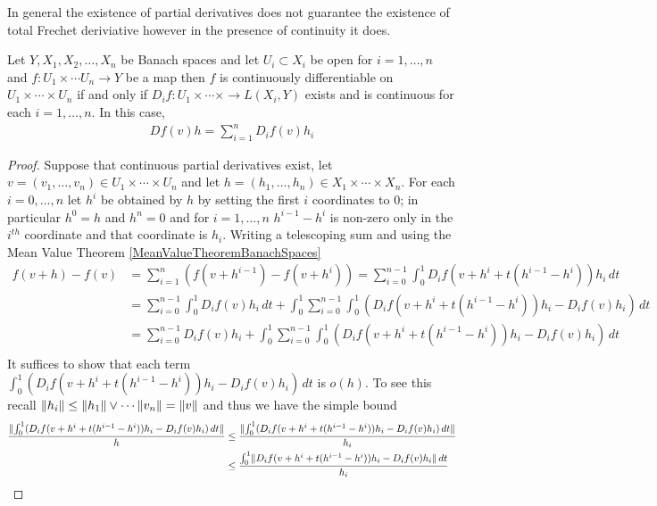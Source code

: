In general the existence of partial derivatives does not guarantee the existence of total Frechet deriviative however in the presence of continuity it does.
\begin{prop}\label{PartialDerivativesBanachSpaces}Let $Y,X_1, X_2, \dotsc, X_n$ be Banach spaces and let $U_i \subset X_i$ be open for $i=1, \dotsc, n$ and $f : U_1 \times \dotsb U_n \to Y$ be a map then $f$ is continuously differentiable on $U_1 \times \dotsb \times U_n$ if and only if $D_i f : U_1 \times \dotsb \times \to L(X_i,Y)$ exists and is continuous for each $i=1, \dotsc,n$.
In this case,
\begin{align*}
D f (v) h = \sum_{i=1}^n D_i f( v) h_i
\end{align*}
\end{prop}
\begin{proof}
Suppose that continuous partial derivatives exist, let $v=(v_1, \dotsc, v_n) \in U_1 \times \dotsb \times U_n$ and let $h=(h_1, \dotsc, h_n) \in X_1 \times \dotsb \times X_n$.  
For each $i=0, \dotsc, n$ let $h^i$ be obtained by $h$ by setting the first $i$ coordinates to $0$; in particular $h^0=h$ and $h^n=0$ and for $i=1, \dotsc, n$ $h^{i-1}-h^{i}$ is non-zero only in the $i^{th}$ coordinate and that coordinate is $h_i$.
Writing a telescoping sum and using the Mean Value Theorem \ref{MeanValueTheoremBanachSpaces}
\begin{align*}
f(v + h) - f(v) &= \sum_{i=1}^{n} (f(v + h^{i-1}) - f(v+h^{i})) = \sum_{i=0}^{n-1} \int_0^1 D_i f(v+h^i + t(h^{i-1}-h^i)) h_i \, dt \\
&=\sum_{i=0}^{n-1} \int_0^1 D_i f (v) h_i \, dt + \int_0^1 \sum_{i=0}^{n-1} \int_0^1 (D_i f(v+h^i + t(h^{i-1}-h^i)) h_i - D_i f (v) h_i )\, dt \\
&=\sum_{i=0}^{n-1} D_i f (v) h_i + \int_0^1 \sum_{i=0}^{n-1} \int_0^1 (D_i f(v+h^i + t(h^{i-1}-h^i)) h_i - D_i f (v) h_i )\, dt \\
\end{align*}
It suffices to show that each term $\int_0^1 (D_i f(v+h^i + t(h^{i-1}-h^i)) h_i - D_i f (v) h_i )\, dt$ is $o(h)$.  To see this recall $\lVert h_i \rVert \leq \lVert h_1 \rVert \vee \dotsb \lVert v_n \rVert = \lVert v \rVert$ and thus we have the simple bound
\begin{align*}
\frac{\norm {\int_0^1 (D_i f(v+h^i + t(h^{i-1}-h^i)) h_i - D_i f (v) h_i )\, dt}}{h} &\leq \frac{\norm {\int_0^1 (D_i f(v+h^i + t(h^{i-1}-h^i)) h_i - D_i f (v) h_i )\, dt}}{h_i} \\
&\leq \frac{\int_0^1 \norm { D_i f(v+h^i + t(h^{i-1}-h^i)) h_i - D_i f (v) h_i }\, dt}{h_i} \\

\end{align*}
\end{proof}
